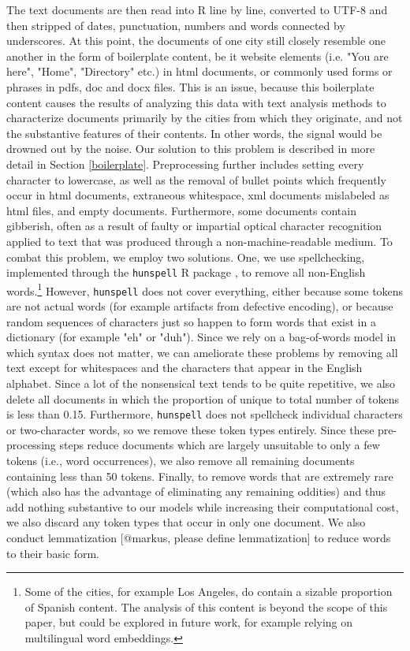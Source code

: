 \documentclass[11pt]{article}
\begin{document}
The text documents are then read into R line by line, converted to UTF-8 and then stripped of dates, punctuation, numbers and words connected by underscores. At this point, the documents of one city still closely resemble one another in the form of boilerplate content, be it website elements (i.e. "You are here", "Home", "Directory" etc.) in html documents, or commonly used forms or phrases in pdfs, doc and docx files. This is an issue, because this boilerplate content causes the results of analyzing this data with text analysis methods to characterize documents primarily by the cities from which they originate, and not the substantive features of their contents. In other words, the signal would be drowned out by the noise. Our solution to this problem is described in more detail in Section \ref{boilerplate}.
Preprocessing further includes setting every character to lowercase, as well as the removal of bullet points which frequently occur in html documents, extraneous whitespace, xml documents mislabeled as html files, and empty documents. Furthermore, some documents contain gibberish, often as a result of faulty or impartial optical character recognition applied to text that was produced through a non-machine-readable medium. To combat this problem, we employ two solutions. One, we use spellchecking, implemented through the \texttt{hunspell} R package \citep{hunspell}, to remove all non-English words.\footnote{Some of the cities, for example Los Angeles, do contain a sizable proportion of Spanish content. The analysis of this content is beyond the scope of this paper, but could be explored in future work, for example relying on multilingual word embeddings.} However, \texttt{hunspell} does not cover everything, either because some tokens are not actual words (for example artifacts from defective encoding), or because random sequences of characters just so happen to form words that exist in a dictionary (for example "eh" or "duh"). Since we rely on a bag-of-words model in which syntax does not matter, we can ameliorate these problems by removing all text except for whitespaces and the characters that appear in the English alphabet. Since a lot of the nonsensical text tends to be quite repetitive, we also delete all documents in which the proportion of unique to total number of tokens is less than 0.15. Furthermore, \texttt{hunspell} does not spellcheck individual characters or two-character words, so we remove these token types entirely. Since these pre-processing steps reduce documents which are largely unsuitable to only a few tokens (i.e., word occurrences), we also remove all remaining documents containing less than 50 tokens. Finally, to remove words that are extremely rare (which also has the advantage of eliminating any remaining oddities) and thus add nothing substantive to our models while increasing their computational cost, we also discard any token types that occur in only one document. We also conduct lemmatization [@markus, please define lemmatization] to reduce words to their basic form.
\end{document}
